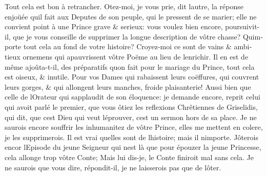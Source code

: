 \documentclass[14pt,a4paper]{memoir}
\begin{document}
\begin{otherlanguage}{french}
Tout cela est bon à retrancher. Otez-moi, je vous prie, dit
l\textquotesingle autre, la réponse enjoüée qu\textquotesingle il fait
aux Deputes de son peuple, qui le pressent de se marier; elle ne
convient point à une Prince grave \& serieux: vous voulez bien encore,
poursuivit-il, que je vous conseille de supprimer la longue description
de vôtre chasse? Qu\textquotesingle importe tout cela au fond de votre
histoire? Croyez-moi ce sont de vains \& ambitieux ornemens qui
apauvrissent vôtre Poëme au lieu de l\textquotesingle enrichir. Il en
est de même ajoûta-t-il, des préparatifs qu\textquotesingle on fait pour
le mariage du Prince, tout cela est oiseux, \& inutile. Pour vos Dames
qui rabaissent leurs coëffures, qui couvrent leurs gorges, \& qui
allongent leurs manches, froide plaisanterie! Aussi bien que celle de
l\textquotesingle Orateur qui s\textquotesingle applaudit de son
éloquence: je demande encore, reprit celui qui avoit parlé le premier,
que vous ôtiez les reflexions Chrêtiennes de Griselidis, qui dit, que
c\textquotesingle est Dieu qui veut l\textquotesingle éprouver,
c\textquotesingle est un sermon hors de sa place. Je ne saurois encore
souffrir les inhumanitez de vôtre Prince, elles me mettent en colere, je
les supprimerois. Il est vrai qu\textquotesingle elles sont de
l\textquotesingle histoire; mais il n\textquotesingle importe.
J\textquotesingle ôterois encor l\textquotesingle Episode du jeune
Seigneur qui n\textquotesingle est là que pour épouzer la jeune
Princesse, cela allonge trop vôtre Conte; Mais lui dis-je, le Conte
finiroit mal sans cela. Je ne saurois que vous dire, répondit-il, je ne
laisserois pas que de l\textquotesingle ôter.


\end{otherlanguage}
\end{document}
